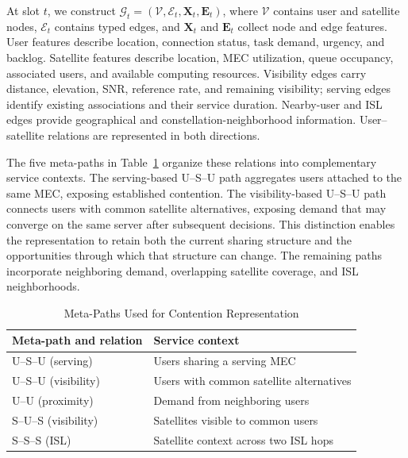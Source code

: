 At slot $t$, we construct
$\mathcal{G}_t=(\mathcal{V},\mathcal{E}_t,\mathbf{X}_t,
\mathbf{E}_t)$, where $\mathcal{V}$ contains user and satellite
nodes, $\mathcal{E}_t$ contains typed edges, and
$\mathbf{X}_t$ and $\mathbf{E}_t$ collect node and edge
features. User features describe location, connection status,
task demand, urgency, and backlog. Satellite features describe
location, MEC utilization, queue occupancy, associated users,
and available computing resources. Visibility edges carry
distance, elevation, SNR, reference rate, and remaining
visibility; serving edges identify existing associations
and their service duration. Nearby-user and ISL edges provide
geographical and constellation-neighborhood information.
User--satellite relations are represented in both directions.

The five meta-paths in Table~\ref{tab:han_metapaths}
organize these relations into complementary service contexts.
The serving-based U--S--U path aggregates users attached to
the same MEC, exposing established contention. The
visibility-based U--S--U path connects users with common
satellite alternatives, exposing demand that may converge
on the same server after subsequent decisions. This
distinction enables the representation to retain both the
current sharing structure and the opportunities through
which that structure can change. The remaining paths
incorporate neighboring demand, overlapping satellite
coverage, and ISL neighborhoods.

\begin{table}[t]
    \caption{Meta-Paths Used for Contention Representation}
    \label{tab:han_metapaths}
    \centering
    \footnotesize
    \renewcommand{\arraystretch}{1.13}
    \begin{tabular}{p{}p{}}
        \hline
        Meta-path and relation & Service context \\
        \hline
        U--S--U (serving) &
        Users sharing a serving MEC \\
        U--S--U (visibility) &
        Users with common satellite alternatives \\
        U--U (proximity) &
        Demand from neighboring users \\
        S--U--S (visibility) &
        Satellites visible to common users \\
        S--S--S (ISL) &
        Satellite context across two ISL hops \\
        \hline
    \end{tabular}
\end{table}

